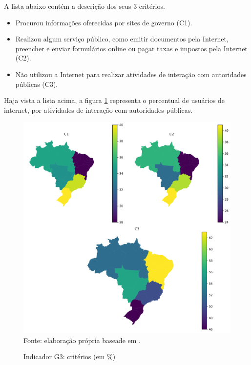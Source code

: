 A lista abaixo contém a descrição dos seus 3 critérios.  

\begin{itemize}
	\item Procurou informações oferecidas por sites de governo (C1).
	\item Realizou algum serviço público, como emitir documentos pela Internet, preencher e enviar formulários online ou pagar taxas e impostos pela Internet (C2).
	\item Não utilizou a Internet para realizar atividades de interação com autoridades públicas (C3).
\end{itemize}

Haja vista a lista acima, a figura \ref{fig:mapa_coropletico_tic_domicilios_2024_g3}  representa o percentual de usuários de internet, por atividades de interação com autoridades públicas. 

\begin{figure}[H]
	\centering
	\caption{Indicador G3: critérios (em \%)}
	\includegraphics[width=1\linewidth]{figuras/mapa_coropletico_tic_domicilios_2024_g3.png}
	\label{fig:mapa_coropletico_tic_domicilios_2024_g3}
	\footnotesize{Fonte: elaboração própria baseade em \cite{tic_domicilios_2024_g3}.}
\end{figure}


